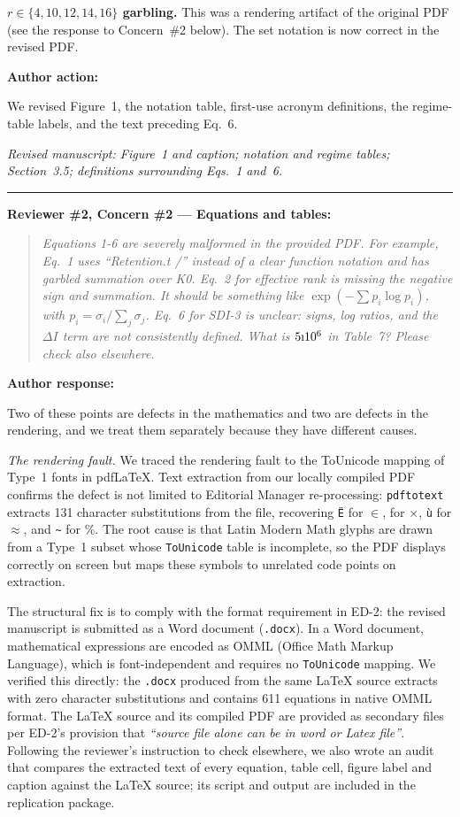 \documentclass[11pt,a4paper]{article}
\newcommand{\rconcern}[3]{%
  \bigskip\noindent\rule{\linewidth}{0.4pt}\par\medskip
  \noindent\textbf{\textcolor{rccolor}{#1 --- #2:}}\par
  \smallskip
  \begin{quote}\itshape\textcolor{rccolor}{#3}\end{quote}%
}
\newcommand{\arhead}[1]{\medskip\noindent\textbf{#1}\par\smallskip}
\newcommand{\msloc}[1]{%
  \smallskip\noindent\textit{Revised manuscript: #1}\par%
}
\begin{document}
\textbf{$r \in \{4,10,12,14,16\}$ garbling.}
This was a rendering artifact of the original PDF (see the response to
Concern~\#2 below). The set notation is now correct in the revised PDF.

\arhead{Author action:}
We revised Figure~1, the notation table, first-use acronym definitions,
the regime-table labels, and the text preceding Eq.~6.

\msloc{Figure~1 and caption; notation and regime tables; Section~3.5;
definitions surrounding Eqs.~1 and~6.}

\rconcern{Reviewer \#2, Concern \#2}{Equations and tables}{Equations 1-6
are severely malformed in the provided PDF. For example, Eq.~1 uses
``Retention.t /'' instead of a clear function notation and has garbled
summation over K0. Eq.~2 for effective rank is missing the negative sign
and summation. It should be something like $\exp(-\sum p_i \log p_i)$,
with $p_i=\sigma_i/\sum_j\sigma_j$. Eq.~6 for SDI-3 is unclear: signs,
log ratios, and the $\Delta I$ term are not consistently defined. What is
$5\text{\i}10^6$ in Table~7? Please check also elsewhere.}

\arhead{Author response:}

Two of these points are defects in the mathematics and two are defects
in the rendering, and we treat them separately because they have
different causes.

\medskip\noindent\emph{The rendering fault.}
We traced the rendering fault to the ToUnicode mapping of Type~1 fonts
in pdf\LaTeX{}. Text extraction from our locally compiled PDF confirms
the defect is not limited to Editorial Manager re-processing:
\texttt{pdftotext} extracts 131 character substitutions from the file,
recovering \texttt{\"E} for $\in$, \texttt{\DJ} for $\times$, \texttt{\`u}
for $\approx$, and \texttt{\~{}} for $\%$. The root cause is that Latin
Modern Math glyphs are drawn from a Type~1 subset whose \texttt{ToUnicode}
table is incomplete, so the PDF displays correctly on screen but maps
these symbols to unrelated code points on extraction.

The structural fix is to comply with the format requirement in ED-2: the
revised manuscript is submitted as a Word document (\texttt{.docx}). In a
Word document, mathematical expressions are encoded as OMML (Office Math
Markup Language), which is font-independent and requires no
\texttt{ToUnicode} mapping. We verified this directly: the \texttt{.docx}
produced from the same \LaTeX{} source extracts with zero character
substitutions and contains 611 equations in native OMML format. The
\LaTeX{} source and its compiled PDF are provided as secondary files per
ED-2's provision that \emph{``source file alone can be in word or Latex
file''}. Following the reviewer's instruction to check elsewhere, we
also wrote an audit that compares the extracted text of every equation,
table cell, figure label and caption against the \LaTeX{} source; its
script and output are included in the replication package.
\end{document}
